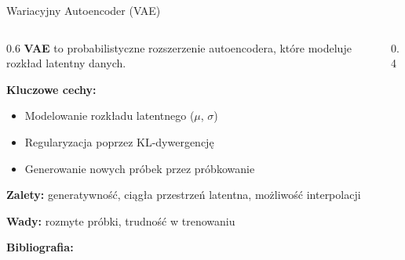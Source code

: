 \documentclass{beamer}
\begin{document}
\begin{frame}{Wariacyjny Autoencoder (VAE)}
    \begin{columns}
        \begin{column}{0.6\textwidth}
            \textbf{VAE} to probabilistyczne rozszerzenie autoencodera, które modeluje rozkład latentny danych.

            \medskip
            \textbf{Kluczowe cechy:}
            \begin{itemize}
                \item Modelowanie rozkładu latentnego ($\mu$, $\sigma$)
                \item Regularyzacja poprzez KL-dywergencję
                \item Generowanie nowych próbek przez próbkowanie
            \end{itemize}

            \textbf{Zalety:} generatywność, ciągła przestrzeń latentna, możliwość interpolacji

            \textbf{Wady:} rozmyte próbki, trudność w trenowaniu

            \textbf{Bibliografia:} \cite{kingma2013auto}
        \end{column}
        \begin{column}{0.4\textwidth}
            \centering
        \end{column}
    \end{columns}
\end{frame}
\end{document}

